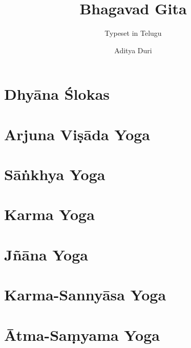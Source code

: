 \documentclass{scrbook}
\title{Bhagavad Gita}
\subtitle{Typeset in Telugu}
\author{Aditya Duri}
\date{}
\begin{document}
\maketitle
\frontmatter

\tableofcontents
\newpage

\chapter{Dhyāna Ślokas}


\mainmatter
\chapter{Arjuna Viṣāda Yoga}


\chapter{Sāṅkhya Yoga}


\chapter{Karma Yoga}


\chapter{Jñāna Yoga}


\chapter{Karma-Sannyāsa Yoga}


\chapter{Ātma-Saṃyama Yoga}

\end{document}
